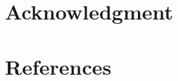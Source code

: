 \documentclass[conference]{IEEEtran}
\begin{document}


\section*{Acknowledgment}


\section*{References}



\end{document}
